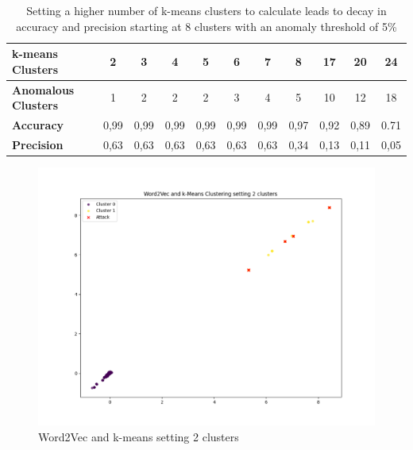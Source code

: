 \documentclass[
    fontsize=12pt,
    headings=small,
    parskip=half,           %
    bibliography=totoc,
    numbers=noenddot,       %
    open=any,               %
    ]{scrreprt}
\begin{document}
\begin{table}[H]
	\caption{Setting a higher number of k-means clusters to calculate leads to decay in accuracy and precision starting at 8 clusters with an anomaly threshold of 5\%}
	\label{tab:k-means_clusters}
	\begin{tabular}{|l|c|c|c|c|c|c|c|c|c|c|}
	\hline
	\textbf{k-means Clusters}   & \textbf{2} & \textbf{3} & \textbf{4} & \textbf{5} & \textbf{6} & \textbf{7} & \textbf{8} & \textbf{17} & \textbf{20} & \textbf{24} \\ \hline
	\textbf{Anomalous Clusters} & 1          & 2          & 2          & 2          & 3          & 4          & 5          & 10          & 12          & 18          \\ \hline
	\textbf{Accuracy}           & 0,99       & 0,99       & 0,99       & 0,99       & 0,99       & 0,99       & 0,97       & 0,92        & 0,89        & 0.71        \\ \hline
	\textbf{Precision}          & 0,63       & 0,63       & 0,63       & 0,63       & 0,63       & 0,63       & 0,34       & 0,13        & 0,11        & 0,05        \\ \hline
	\end{tabular}
\end{table}

\begin{figure}[H]
	\caption{Word2Vec and k-means setting 2 clusters}
	\label{fig:kmeans_clusters_2}
	\sffamily\footnotesize
	\includegraphics[width=1\textwidth]{pic/k_means_2.png}
	\unitlength=0.75mm
	\linethickness{0.4pt}
\end{figure}
\end{document}
